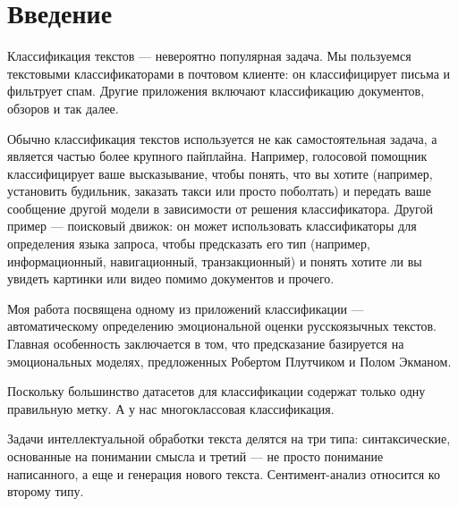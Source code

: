 \chapter*{Введение}

\par
Классификация текстов --- невероятно популярная задача. Мы пользуемся текстовыми классификаторами в почтовом клиенте: он классифицирует письма и фильтрует спам. Другие приложения включают классификацию документов, обзоров и так далее.

\bigskip\par
Обычно классификация текстов используется не как самостоятельная задача, а является частью более крупного пайплайна. Например, голосовой помощник классифицирует ваше высказывание, чтобы понять, что вы хотите (например, установить будильник, заказать такси или просто поболтать) и передать ваше сообщение другой модели в зависимости от решения классификатора.  Другой пример --- поисковый движок: он может использовать классификаторы для определения языка запроса, чтобы предсказать его тип (например, информационный, навигационный, транзакционный) и понять хотите ли вы увидеть картинки или видео помимо документов и прочего.

\bigskip\par
Моя работа посвящена одному из приложений классификации --- автоматическому определению эмоциональной оценки русскоязычных текстов. Главная особенность  заключается в том, что предсказание базируется на эмоциональных моделях, предложенных Робертом Плутчиком и Полом Экманом.


\bigskip\par
Поскольку большинство датасетов для классификации содержат только одну правильную метку. А у нас многоклассовая классификация.

Задачи интеллектуальной обработки текста делятся на три типа: синтаксические, основанные на понимании
смысла и третий --- не просто понимание написанного, а еще и генерация нового текста. Сентимент-анализ
относится ко второму типу.
